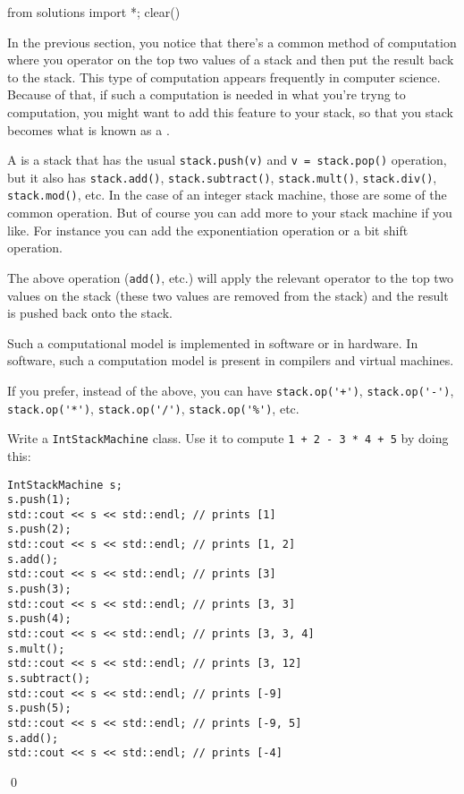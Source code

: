 \begin{python0}
from solutions import *; clear()
\end{python0}

In the previous section, you notice that there's a common
method of computation where you operator on the top two
values of a stack and then put the result back to the stack.
This type of computation appears frequently in computer science.
Because of that, if such a computation is needed in what you're
tryng to computation, you might want to
add this feature to your stack, so that you
stack becomes what is known as a .

A  is a stack that has the usual
\texttt{stack.push(v)} and
\texttt{v = stack.pop()} operation, but it also has
\texttt{stack.add()},
\texttt{stack.subtract()},
\texttt{stack.mult()},
\texttt{stack.div()},
\texttt{stack.mod()},
etc.
In the case of an integer stack machine, those
are some of the common operation.
But of course you can add more to your stack machine if you like.
For instance you can add the exponentiation operation
or a bit shift operation.

The above operation (\texttt{add()}, etc.)
  will apply the relevant operator to the top two
values on the stack (these two values are removed from the stack)
and the result is pushed back onto the stack.

Such a computational model is implemented in software or in hardware.
In software, such a computation model is present in compilers
and virtual machines.

If you prefer, instead of the above, you can have
\verb!stack.op('+')!,
\verb!stack.op('-')!,
\verb!stack.op('*')!,
\verb!stack.op('/')!,
\verb!stack.op('%')!, etc.

\begin{ex}
Write a \texttt{IntStackMachine} class.
Use it to compute \texttt{1 + 2 - 3 * 4 + 5} by doing this:
\begin{Verbatim}[frame=single]
IntStackMachine s;
s.push(1);
std::cout << s << std::endl; // prints [1]
s.push(2);
std::cout << s << std::endl; // prints [1, 2]
s.add();
std::cout << s << std::endl; // prints [3]
s.push(3);
std::cout << s << std::endl; // prints [3, 3]
s.push(4);
std::cout << s << std::endl; // prints [3, 3, 4]
s.mult();
std::cout << s << std::endl; // prints [3, 12]
s.subtract();
std::cout << s << std::endl; // prints [-9]
s.push(5);
std::cout << s << std::endl; // prints [-9, 5]
s.add();
std::cout << s << std::endl; // prints [-4]
\end{Verbatim}
\qed
\end{ex}

